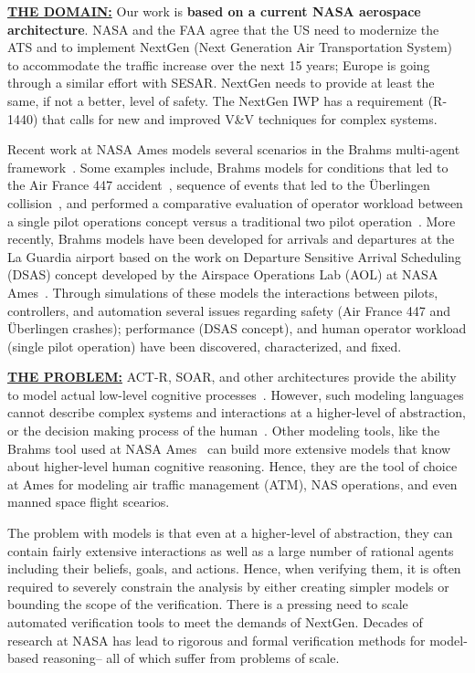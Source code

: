 \documentclass[12pt]{article}
\begin{document}
\underline{{\bf  THE DOMAIN:}} Our work is {\bf based on a current NASA  aerospace architecture}.
NASA and the FAA agree that the US need to modernize the ATS and to implement NextGen (Next Generation Air Transportation System) to accommodate the traffic increase over the next 15 years; Europe is going through a similar effort with SESAR. NextGen needs to provide at least the same, if not a better, level of safety. The  NextGen IWP has a requirement (R-1440) that calls for new and improved V\&V techniques for complex systems. 

Recent work at NASA Ames models several scenarios in the Brahms multi-agent framework~\cite{clancey1998brahms,SierhuisPhD}. Some examples include, Brahms models for conditions that led to the Air France 447 accident~\cite{hunter:aamas13}, sequence of events that led to the \"{U}berlingen collision~\cite{Rungta:2013}, and performed a comparative evaluation of operator workload between a single pilot operations concept versus a traditional two pilot
operation~\cite{Stocker:2015}. More recently, Brahms models have been developed for arrivals and departures at the La Guardia airport based on the work on Departure Sensitive Arrival Scheduling (DSAS) concept developed by the Airspace Operations Lab (AOL) at NASA Ames~\cite{dsas}. Through simulations of these models the interactions between pilots, controllers, and automation several issues regarding safety (Air France 447 and  \"{U}berlingen crashes); performance (DSAS concept), and human operator workload (single pilot operation) have been discovered, characterized, and fixed. 
 
 
\underline{{\bf  THE PROBLEM:}} 
ACT-R, SOAR, and other architectures provide the ability to model actual low-level cognitive processes~\cite{anderson1997act,laird1987soar,lebiere2013cognitive,liu2009qn,lundinsimulating}. However,  such modeling languages cannot  describe complex systems and interactions at a higher-level of abstraction, or   the decision making process of the human~\cite{pritchett2011simulating}. 
Other modeling tools, like the Brahms tool used at NASA Ames~\cite{Rungta:2013,Clancey:1998:BSP:306180.306196,brahms-semantics,brahms-jelia,SierhuisPhD} can build more extensive models that know about higher-level human cognitive reasoning. Hence, they are the tool of choice at Ames for modeling air traffic management (ATM), NAS operations, and even manned space flight scearios.

The problem with models is that even at a higher-level of abstraction, they can contain fairly extensive interactions as well as a large number of rational agents including their beliefs, goals, and actions. Hence, when verifying them, it is often required to severely constrain the analysis by either creating simpler models or bounding the scope of the verification.
There is a pressing need to scale automated verification tools to meet the demands of NextGen. Decades of research at NASA has lead to rigorous and formal verification methods for model-based reasoning-- all of which suffer from problems of scale.  
 
\end{document}
